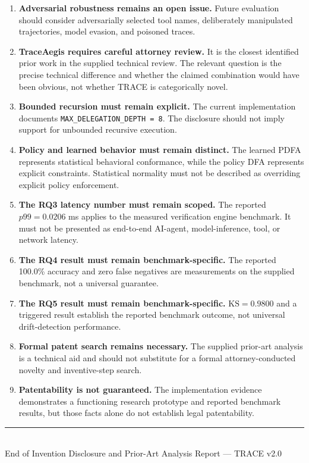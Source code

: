\documentclass[11pt,a4paper]{article}
\begin{document}
\begin{enumerate}[leftmargin=1.8em, itemsep=0.5em]
\item \textbf{Adversarial robustness remains an open issue.}
Future evaluation should consider adversarially selected tool names, deliberately
manipulated trajectories, model evasion, and poisoned traces.

\item \textbf{TraceAegis requires careful attorney review.}
It is the closest identified prior work in the supplied technical review. The relevant
question is the precise technical difference and whether the claimed combination would
have been obvious, not whether TRACE is categorically novel.

\item \textbf{Bounded recursion must remain explicit.}
The current implementation documents
\texttt{MAX\_}\allowbreak\texttt{DELEGATION\_}\allowbreak\texttt{DEPTH = 8}. The disclosure should not imply support for
unbounded recursive execution.

\item \textbf{Policy and learned behavior must remain distinct.}
The learned PDFA represents statistical behavioral conformance, while the policy DFA
represents explicit constraints. Statistical normality must not be described as
overriding explicit policy enforcement.

\item \textbf{The RQ3 latency number must remain scoped.}
The reported $p99=0.0206$ ms applies to the measured verification engine benchmark. It
must not be presented as end-to-end AI-agent, model-inference, tool, or network latency.

\item \textbf{The RQ4 result must remain benchmark-specific.}
The reported 100.0\% accuracy and zero false negatives are measurements on the supplied
benchmark, not a universal guarantee.

\item \textbf{The RQ5 result must remain benchmark-specific.}
$\mathrm{KS}=0.9800$ and a triggered result establish the reported benchmark outcome,
not universal drift-detection performance.

\item \textbf{Formal patent search remains necessary.}
The supplied prior-art analysis is a technical aid and should not substitute for a
formal attorney-conducted novelty and inventive-step search.

\item \textbf{Patentability is not guaranteed.}
The implementation evidence demonstrates a functioning research prototype and reported
benchmark results, but those facts alone do not establish legal patentability.

\end{enumerate}

\vfill

\begin{center}
\rule{0.5\textwidth}{0.4pt}\\[4pt]
\small\textcolor{tracegray}
{End of Invention Disclosure and Prior-Art Analysis Report --- TRACE v2.0}
\end{center}
\end{document}
